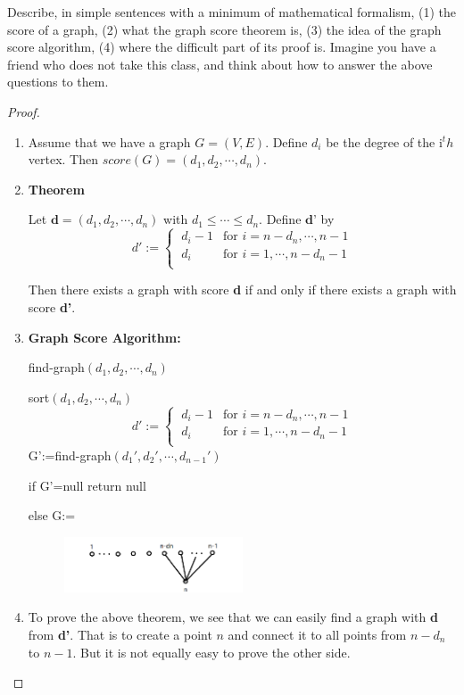 \documentclass[12pt,a4]{article}
\begin{document}
\begin{exercise}
  Describe, in simple sentences with a minimum of mathematical formalism, (1) the score
  of a graph, (2) what the graph score theorem is, (3) the idea of the
  graph score algorithm, (4) where the difficult part of its proof is.
  Imagine you have a friend who does not take this class, and think about how to answer
  the above questions to them.
\end{exercise}
\begin{proof}
  \begin{enumerate}
    \item
    Assume that we have a graph $G=(V,E)$. Define $d_i$ be the degree of the i$^th$ vertex. Then $score(G)=(d_1,d_2,\cdots,d_n)$.
    \item
    \textbf{Theorem}

    Let $\textbf{d}=(d_1,d_2,\cdots,d_n)$ with $d_1 \leq \cdots \leq d_n$. Define $\textbf{d'}$ by
    \begin{equation*}
    d':=
    \begin{cases}
    \ d_i-1 & \text{for } i=n-d_n,\cdots,n-1 \\
    \ d_i & \text{for } i=1,\cdots,n-d_n-1 \\
    \end{cases}
    \end{equation*}


  Then there exists a graph with score \textbf{d} if and only if there exists a graph with score \textbf{d'}.

  \item
  \textbf{Graph Score Algorithm:}

  find-graph$(d_1,d_2,\cdots,d_n)$

  \quad  sort$(d_1,d_2,\cdots,d_n)$
    \begin{equation*}
    d':=
    \begin{cases}
    \ d_i-1 & \text{for } i=n-d_n,\cdots,n-1 \\
    \ d_i & \text{for } i=1,\cdots,n-d_n-1 \\
    \end{cases}
    \end{equation*}
  \quad \quad G':=find-graph$(d_1',d_2',\cdots,d_{n-1}')$

  \quad  if G'=null return null

  \quad  else G:=
    \begin{figure}[htbp]
        \centering
        \includegraphics[width=0.5\textwidth]{1.jpg}
    \end{figure}

    \item
    To prove the above theorem, we see that we can easily find a graph with \textbf{d} from \textbf{d'}. That is to create a point $n$ and connect it to all points from $n-d_n$ to $n-1$. But it is not equally easy to prove the other side.
  \end{enumerate}
\end{proof}
\end{document}
